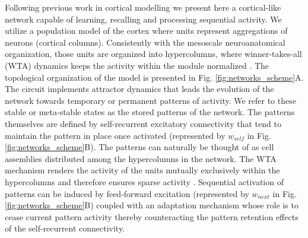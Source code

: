 \documentclass[10pt,a4paper]{article}
\begin{document}
Following previous work in cortical modelling \cite{tully2016spike, lundqvist2006attractor} we present here a cortical-like network capable of learning, recalling and processing sequential activity. We utilize a population model of the cortex where units represent aggregations of neurons (cortical columns). Consistently with the mesoscale neuroanatomical organization, those units are organized into hypercolumns, where winner-takes-all (WTA) dynamics keeps the activity within the module normalized \cite{douglas2004neuronal}. The topological organization of the model is presented in Fig. \ref{fig:networks_scheme}A. The circuit implements attractor dynamics \cite{lansner2009associative} that leads the evolution of the network towards temporary or permanent patterns of activity. We refer to these stable or meta-stable states as the stored patterns of the network. The patterns themselves are defined by self-recurrent excitatory connectivity that tend to maintain the pattern in place once activated (represented by $w_{self}$ in Fig. \ref{fig:networks_scheme}B). The patterns can naturally be thought of as cell assemblies distributed among the hypercolumns in the network. The WTA mechanism renders the activity of the units mutually exclusively within the hypercolumns and therefore ensures sparse activity \cite{foldiak2003sparse}. Sequential activation of patterns can be induced by feed-forward excitation (represented by $w_{next}$ in Fig. \ref{fig:networks_scheme}B) coupled with an adaptation mechanism whose role is to cease current pattern activity thereby counteracting the pattern retention effects of the self-recurrent connectivity. 
\end{document}
